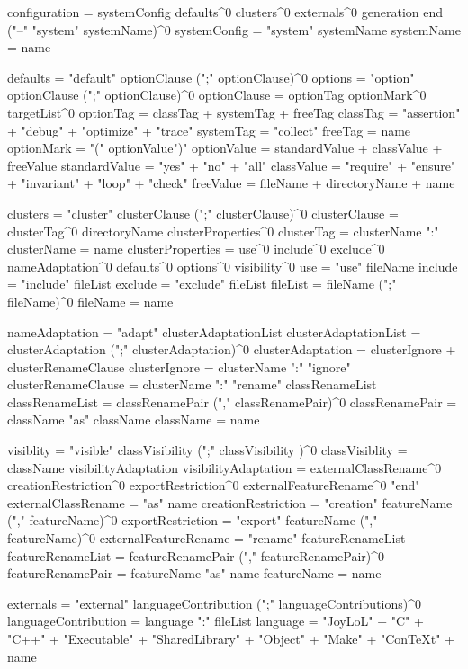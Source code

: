 
\starttyping
configuration = systemConfig 
  defaults^0 
  clusters^0 
  externals^0 
  generation
  end ("--" "system" systemName)^0
systemConfig = "system" systemName
systemName   = name

defaults = "default" optionClause (";" optionClause)^0
options  = "option" optionClause (";" optionClause)^0
optionClause = optionTag optionMark^0 targetList^0
optionTag    = classTag + systemTag + freeTag
classTag     = "assertion" + "debug" + "optimize" + "trace"
systemTag    = "collect"
freeTag      = name
optionMark   = "(" optionValue")"
optionValue  = standardValue + classValue + freeValue
standardValue = "yes" + "no" + "all"
classValue    = "require" + "ensure" + "invariant" + "loop" + "check"
freeValue     = fileName + directoryName + name

clusters = "cluster" clusterClause (";" clusterClause)^0
clusterClause = clusterTag^0 directoryName clusterProperties^0
clusterTag    = clusterName ":"
clusterName   = name
clusterProperties = use^0
  include^0
  exclude^0
  nameAdaptation^0
  defaults^0
  options^0
  visibility^0
use = "use" fileName
include = "include" fileList
exclude = "exclude" fileList
fileList = fileName (";" fileName)^0
fileName = name

nameAdaptation = "adapt" clusterAdaptationList
clusterAdaptationList = clusterAdaptation (";" clusterAdaptation)^0
clusterAdaptation = clusterIgnore + clusterRenameClause
clusterIgnore = clusterName ":" "ignore"
clusterRenameClause = clusterName ":" "rename" classRenameList
classRenameList = classRenamePair ("," classRenamePair)^0
classRenamePair = className "as" className
className = name

visiblity = "visible" classVisibility (";" classVisibility )^0
classVisiblity = className visibilityAdaptation
visibilityAdaptation = externalClassRename^0
  creationRestriction^0
  exportRestriction^0
  externalFeatureRename^0
  "end"
externalClassRename = "as" name
creationRestriction = "creation" featureName ("," featureName)^0
exportRestriction = "export" featureName ("," featureName)^0
externalFeatureRename = "rename" featureRenameList
featureRenameList = featureRenamePair ("," featureRenamePair)^0
featureRenamePair = featureName "as" name
featureName = name

externals = "external" languageContribution (";" languageContributions)^0
languageContribution = language ":" fileList
language = "JoyLoL" +
  "C" + "C++" +
  "Executable" + "SharedLibrary" + 
  "Object" +
  "Make" +
  "ConTeXt" +
  name

